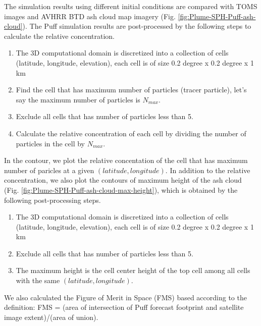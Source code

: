 \documentclass[utf8]{frontiersSCNS} %
\begin{document}
The simulation results using different initial conditions are compared with TOMS images and AVHRR BTD ash cloud map imagery (Fig. \ref{fig:Plume-SPH-Puff-ash-cloud}). The Puff simulation results are post-processed by the following steps to calculate the relative concentration.
\begin{enumerate}
\item The 3D computational domain is discretized into a collection of cells (latitude, longitude, elevation), each cell is of size 0.2 degree x 0.2 degree x 1 km
\item  Find the cell that has maximum number of particles (tracer particle), let's say the maximum number of particles is $N_{max}$.
\item Exclude all cells that has number of particles less than 5.
\item Calculate the relative concentration of each cell by dividing the number of particles in the cell by $N_{max}$.
\end{enumerate}
In the contour, we plot the relative concentation of the cell that has maximum number of paricles at a given $(latitude, longitude)$.
In addition to the relative concentration, we also plot the contours of maximum height of the ash cloud (Fig. \ref{fig:Plume-SPH-Puff-ash-cloud-max-height}), which is obtained by the following post-processing steps.
\begin{enumerate}
\item The 3D computational domain is discretized into a collection of cells (latitude, longitude, elevation), each cell is of size 0.2 degree x 0.2 degree x 1 km
\item Exclude all cells that has number of particles less than 5.
\item The maximum height is the cell center height of the top cell among all cells with the same $(latitude, longitude)$.
\end{enumerate}
We also calculated the Figure of Merit in Space (FMS) based according to the definition: FMS = (area of intersection of Puff forecast footprint and satellite image extent)/(area of union).
\end{document}
